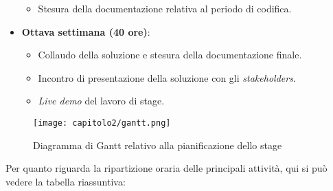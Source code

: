 \begin{itemize}
\begin{itemize}
      \item Stesura della documentazione relativa al periodo di codifica.
  \end{itemize}
  \item \textbf{Ottava settimana (40 ore)}:
  \begin{itemize}
      \item Collaudo della soluzione e stesura della documentazione finale.
      \item Incontro di presentazione della soluzione con gli \textit{stakeholders}.
      \item \textit{Live demo} del lavoro di stage.
  \end{itemize}
\end{itemize}

\begin{figure}[!h]
  \centering
  \texttt{[image: capitolo2/gantt.png]}
  \caption{Diagramma di Gantt relativo alla pianificazione dello stage}
\end{figure}

Per quanto riguarda la ripartizione oraria delle principali attività, qui si può vedere la tabella riassuntiva: \\

